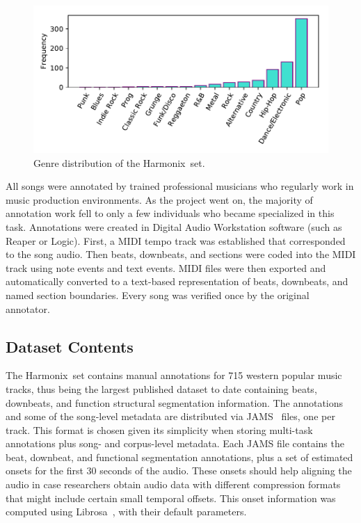 \documentclass{article}
\newcommand{\setName}{Harmonix}
\begin{document}
\begin{figure}
    \centerline{\includegraphics[width=\columnwidth]{figs/PublishedGenres_distribution.pdf}}
    \caption{Genre distribution of the \setName~set.}
    \label{fig:genres_dist}
\end{figure}

All songs were annotated by trained professional musicians who regularly work in music production environments. As the project went on, the majority of annotation work fell to only a few individuals who became specialized in this task. Annotations were created in Digital Audio Workstation software (such as Reaper or Logic). First, a MIDI tempo track was established that corresponded to the song audio. Then beats, downbeats, and sections were coded into the MIDI track using note events and text events. MIDI files were then exported and automatically converted to a text-based representation of beats, downbeats, and named section boundaries. Every song was verified once by the original annotator.


\subsection{Dataset Contents}

The \setName~set contains manual annotations for 715 western popular music tracks, thus being the largest published  dataset to date containing beats, downbeats, and function structural segmentation information.
The annotations and some of the song-level metadata are distributed via JAMS~\cite{Humphrey2014} files, one per track.
This format is chosen given its simplicity when storing multi-task annotations plus song- and corpus-level metadata.
Each JAMS file contains the beat, downbeat, and functional segmentation annotations, plus a set of estimated onsets for the first 30 seconds of the audio.
These onsets should help aligning the audio in case researchers obtain audio data with different compression formats that might include certain small temporal offsets.
This onset information was computed using Librosa~\cite{Mcfee2015a}, with their default parameters.
\end{document}
